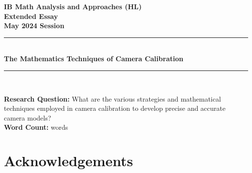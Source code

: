 \documentclass[12pt, oneside]{article}
\begin{document}
\pagestyle{frontmatter}

\begin{titlepage}
    \large

    \begin{center}

        \vspace*{2cm}

        {\bfseries
            IB Math Analysis and Approaches (HL) \\
            Extended Essay\\
            May 2024 Session}\\

        \vspace*{\fill}

        \rule{\linewidth}{1.5pt} \\ [0.5cm]
        {\LARGE \bfseries The Mathematics Techniques of Camera Calibration}
        \rule{\linewidth}{0.5pt} \\

        \vspace*{\fill}

        \textbf{Research Question:} What are the various strategies and mathematical techniques employed in camera calibration to develop precise and accurate camera models?\\ [1cm]

        \textbf{Word Count:} \wordcount words

        \vspace*{2cm}

    \end{center}

\end{titlepage}

\tableofcontents
\clearpage
\pagestyle{mainmatter}
\setcounter{page}{1}









\section*{Acknowledgements}
\end{document}
